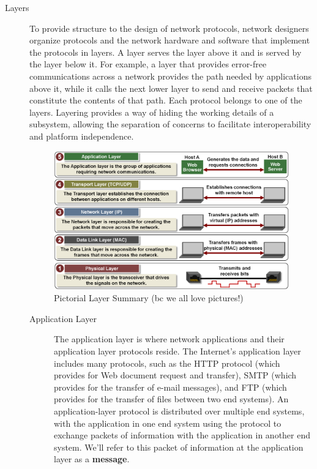 \documentclass{article}
\begin{document}
\begin{description}
    \item[Layers] To provide structure to the design of network protocols, network designers organize protocols and the network hardware and software that implement the protocols in layers. A layer serves the layer above it and is served by the layer below it. For example, a layer that provides error-free communications across a network provides the path needed by applications above it, while it calls the next lower layer to send and receive packets that constitute the contents of that path. Each protocol belongs to one of the layers. Layering provides a way of hiding the working details of a subsystem, allowing the separation of concerns to facilitate interoperability and platform independence.
    
    \begin{figure}[H]
        \includegraphics[scale=0.5]{images/5_layer_overview.png}
        \centering
        \caption{Pictorial Layer Summary (bc we all love pictures!)}
    \end{figure}
    
    \begin{description}
        \item[Application Layer] The application layer is where network applications and their application layer protocols reside. The Internet’s application layer includes many protocols, such as the HTTP protocol (which provides for Web document request and transfer), SMTP (which provides for the transfer of e-mail messages), and FTP (which provides for the transfer of files between two end systems). An application-layer protocol is distributed over multiple end systems, with the
        application in one end system using the protocol to exchange packets of information
        with the application in another end system. We’ll refer to this packet of information
        at the application layer as a {\bf message}.
        

\end{description}
\end{description}
\end{document}
